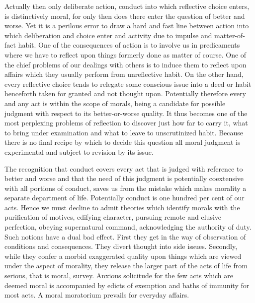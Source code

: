\documentclass[12pt]{article}
\begin{document}
Actually then only deliberate action, conduct into
which reflective choice enters, is distinctively moral, for
only then does there enter the question of better and
worse. Yet it is a perilous error to draw a hard and
fast line between action into which deliberation and
choice enter and activity due to impulse and matter-of-fact
habit. One of the consequences of action is to involve
us in predicaments where we have to reflect upon
things formerly done as matter of course. One of the
chief problems of our dealings with others is to induce
them to reflect upon affairs which they usually perform
from unreflective habit. On the other hand, every reflective
choice tends to relegate some conscious issue
into a deed or habit henceforth taken for granted and
not thought upon. Potentially therefore every and
any act is within the scope of morals, being a candidate
for possible judgment with respect to its better-or-worse
quality. It thus becomes one of the most perplexing
problems of reflection to discover just how far
to carry it, what to bring under examination and what
to leave to unscrutinized habit. Because there is no
final recipe by which to decide this question all moral
judgment is experimental and subject to revision by its
issue.

The recognition that conduct covers every act that
is judged with reference to better and worse and that
the need of this judgment is potentially coextensive
with all portions of conduct, saves us from the mistake
which makes morality a separate department of life.
Potentially conduct is one hundred per cent of our acts.
Hence we must decline to admit theories which identify
morals with the purification of motives, edifying character,
pursuing remote and elusive perfection, obeying
supernatural command, acknowledging the authority of
duty. Such notions have a dual bad effect. First they
get in the way of observation of conditions and consequences.
They divert thought into side issues. Secondly,
while they confer a morbid exaggerated quality
upon things which are viewed under the aspect of morality,
they release the larger part of the acts of life
from serious, that is moral, survey. Anxious solicitude
for the few acts which are deemed moral is accompanied
by edicts of exemption and baths of immunity for most
acts. A moral moratorium prevails for everyday
affairs.
\end{document}
